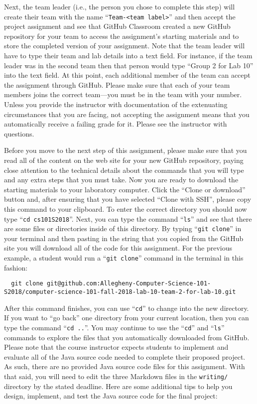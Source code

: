 \documentclass[11pt]{article}
\newcommand{\command}[1]{``\lstinline{#1}''}
\newcommand{\program}[1]{\lstinline{#1}}
\newcommand{\step}[1]{``{#1}''}
\begin{document}
Next, the team leader (i.e., the person you chose to complete this step) will
create their team with the name \command{Team-<team label>} and then accept the
project assignment and see that GitHub Classroom created a new GitHub
repository for your team to access the assignment's starting materials and to
store the completed version of your assignment. Note that the team leader will
have to type their team and lab details into a text field. For instance, if the
team leader was in the second team then that person would type ``Group 2 for
Lab 10'' into the text field. At this point, each additional member of the team
can accept the assignment through GitHub. Please make sure that each of your
team members joins the correct team---you must be in the team with your number.
Unless you provide the instructor with documentation of the extenuating
circumstances that you are facing, not accepting the assignment means that you
automatically receive a failing grade for it. Please see the instructor with
questions.

Before you move to the next step of this assignment, please make sure that you
read all of the content on the web site for your new GitHub repository, paying
close attention to the technical details about the commands that you will type
and any extra steps that you must take. Now you are ready to download the
starting materials to your laboratory computer. Click the ``Clone or download''
button and, after ensuring that you have selected ``Clone with SSH'', please
copy this command to your clipboard. To enter the correct directory you should
now type \command{cd cs101S2018}. Next, you can type the command \command{ls}
and see that there are some files or directories inside of this directory. By
typing \command{git clone} in your terminal and then pasting in the string that
you copied from the GitHub site you will download all of the code for this
assignment. For the previous example, a student would run a \command{git clone}
command in the terminal in this fashion:

\begin{lstlisting}
  git clone git@github.com:Allegheny-Computer-Science-101-S2018/computer-science-101-fall-2018-lab-10-team-2-for-lab-10.git
\end{lstlisting}

After this command finishes, you can use \command{cd} to change into the new directory. If you want to \step{go back}
one directory from your current location, then you can type the command \command{cd ..}. You may continue to use the
\command{cd} and \command{ls} commands to explore the files that you automatically downloaded from GitHub. Please note
that the course instructor expects students to implement and evaluate all of the Java source code needed to complete
their proposed project. As such, there are no provided Java source code files for this assignment. With that said, you
will need to edit the three Markdown files in the \program{writing/} directory by the stated deadline. Here are some
additional tips to help you design, implement, and test the Java source code for the final project:
\end{document}
